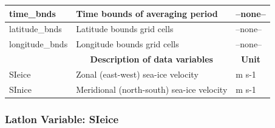 \begin{longtable}{|m{}|m{}|m{}|}
time\_bnds &Time bounds of averaging period &--none--  \\ \hline
latitude\_bnds &Latitude bounds grid cells &--none--  \\ \hline
longitude\_bnds &Longitude bounds grid cells &--none--  \\ \hline
\rowcolor{lightgray} \multicolumn{1}{|c|}{\textbf{Variables}} & \multicolumn{1}{|c|}{\textbf{Description of data variables}} &  \multicolumn{1}{|c|}{\textbf{Unit}}\\ \hline
SIeice &Zonal (east-west) sea-ice velocity &m s-1  \\ \hline
SInice &Meridional (north-south) sea-ice velocity &m s-1  \\ \hline
\end{longtable}

\newp
\pagebreak
\subsubsection{Latlon Variable: SIeice}
